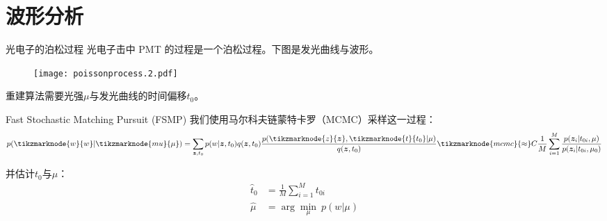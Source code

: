 \documentclass[aspectratio=169]{beamer}
\begin{document}
\section{波形分析}
\begin{frame}{光电子的泊松过程}
    光电子击中 PMT 的过程是一个泊松过程。下图是发光曲线与波形。
    \begin{figure}
        \texttt{[image: poissonprocess.2.pdf]}
    \end{figure}
    重建算法需要光强$\mu$与发光曲线的时间偏移$t_0$。
\end{frame}
\begin{frame}{Fast Stochastic Matching Pursuit (FSMP)}
    我们使用马尔科夫链蒙特卡罗（MCMC）采样这一过程：
    \vspace{8pt}
    \begin{equation}
        p(\tikzmarknode{w}{w}|\tikzmarknode{mu}{\mu})=\sum_{\bm{z},t_0}p(w|\bm{z},t_0)q(\bm{z},t_0)\frac{p(\tikzmarknode{z}{\bm{z}},\tikzmarknode{t}{t_0}|\mu)}{q(\bm{z},t_0)}\tikzmarknode{mcmc}{\approx} C \frac{1}{M}\sum_{i=1}^M\frac{p(\bm{z}_i|t_{0i},\mu)}{p(\bm{z}_i|t_{0i},\mu_0)}
    \end{equation}
    并估计$t_0$与$\mu$：
    \begin{equation}
        \begin{aligned}
            \hat{t}_0 & =\frac{1}{M}\sum_{i=1}^M t_{0i}     \\
            \hat{\mu} & =\arg\underset{\mu}{\min} ~p(w|\mu)
        \end{aligned}
    \end{equation}
\end{frame}
\end{document}
